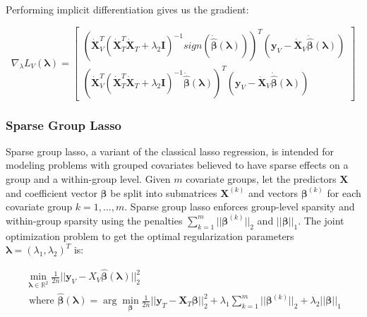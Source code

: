 \documentclass[10pt,letterpaper]{article}
\begin{document}
Performing implicit differentiation gives us the gradient:

\begin{equation}
\nabla_\lambda L_V(\boldsymbol{\lambda}) =
\begin{bmatrix}
(\dot{\boldsymbol{X}}_V^T(\dot{\boldsymbol{X}}_T^T \dot{\boldsymbol{X}}_T + \lambda_2 \boldsymbol{I})^{-1}
sign(\dot{\hat{\boldsymbol{\beta}}} (\boldsymbol{\lambda})))^T
(\boldsymbol y_V - \dot{\boldsymbol{X}}_V \dot{\hat{\boldsymbol{\beta}}} (\boldsymbol{\lambda}))\\
(\dot{\boldsymbol{X}}_V^T(\dot{\boldsymbol{X}}_T^T \dot{\boldsymbol{X}}_T + \lambda_2 \boldsymbol{I})^{-1} \dot{\hat{\boldsymbol{\beta}}} (\boldsymbol{\lambda}))^T
(\boldsymbol y_V - \dot{\boldsymbol{X}}_V \dot{\hat{\boldsymbol{\beta}}} (\boldsymbol{\lambda}))
\end{bmatrix}
\end{equation}

\subsubsection{Sparse Group Lasso}

Sparse group lasso, a variant of the classical lasso regression, is intended for modeling problems with grouped covariates believed to have sparse effects on a group and a within-group level. Given $m$ covariate groups, let the predictors $\boldsymbol{X}$ and coefficient vector $\boldsymbol \beta$ be split into submatrices $\boldsymbol{X}^{(k)}$ and vectors $\boldsymbol \beta^{(k)}$ for each covariate group $k = 1, ... , m$. Sparse group lasso enforces group-level sparsity and within-group sparsity using the penalties $\sum_{k=1}^m \lvert\lvert \boldsymbol\beta^{(k)} \rvert \rvert_2$ and $||\boldsymbol\beta ||_1$. The joint optimization problem to get the optimal regularization parameters $\boldsymbol{\lambda} = (\lambda_1, \lambda_2)^T$ is:

\begin{equation}
\begin{array}{c}
\min_{\boldsymbol{\lambda} \in \mathbb{R}^2} \frac{1}{2n} \bigl\lvert\bigl\lvert \boldsymbol{y}_V - X_V \hat{\boldsymbol{\beta}}(\boldsymbol{\lambda}) \bigl\rvert\bigl\rvert^2_2 \\
\text{ where }
\hat{\boldsymbol{\beta}}(\boldsymbol{\lambda}) = \arg\min_{\boldsymbol{\beta}} \frac{1}{2n} \bigl\lvert\bigl\lvert \boldsymbol{y}_T - \boldsymbol{X}_T \boldsymbol{\beta} \bigl\rvert\bigl\rvert^2_2
+ \lambda_1 \sum_{k=1}^m \lvert\lvert \boldsymbol\beta^{(k)} \rvert \rvert_2
+ \lambda_2 \lvert\lvert \boldsymbol\beta \rvert \rvert_1
\end{array}
\end{equation}
\end{document}

